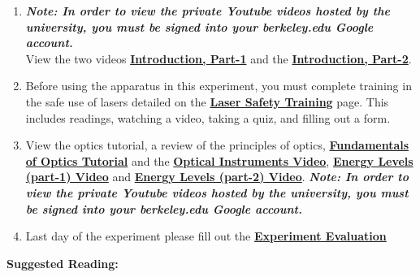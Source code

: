 \documentclass{../lab}
\begin{document}
\begin{enumerate}

    \item \emph{\textbf{Note: In order to view the private Youtube videos hosted by the university, you must be signed into your berkeley.edu Google account.}}\\ 
    View the two videos \href{http://youtu.be/JZJlyaIT3B4}{\textbf{Introduction, Part-1}} and the \href{http://youtu.be/h81p2LXkgZY}{\textbf{Introduction, Part-2}}.

    \item Before using the apparatus in this experiment, you must complete training in the safe use of lasers detailed on the \href{https://berkeley-physics111b.github.io/safety/laser/}{\textbf{Laser Safety Training}} page. This includes readings, watching a video, taking a quiz, and filling out a form.

    \item View the optics tutorial, a review of the principles of optics, \href{https://berkeley-physics111b.github.io/assets/pdf/oldwebsitestructure/ATM/fundamental-Optics.pdf}{\textbf{Fundamentals of Optics Tutorial}} and the \href{http://youtu.be/zUGBt5vc5FA}{\textbf{Optical Instruments Video}}, \href{http://youtu.be/wyBOVjU5bBQ}{\textbf{Energy Levels (part-1) Video}} and \href{http://youtu.be/Eypw0DmVBxk}{\textbf{Energy Levels (part-2) Video}}. \emph{\textbf{Note: In order to view the private Youtube videos hosted by the university, you must be signed into your berkeley.edu Google account.}}

    \item Last day of the experiment please fill out the \href{\ExperimentEvaluation}{\textbf{Experiment Evaluation}}

\end{enumerate}

\noindent\textbf{Suggested Reading:}
\end{document}
